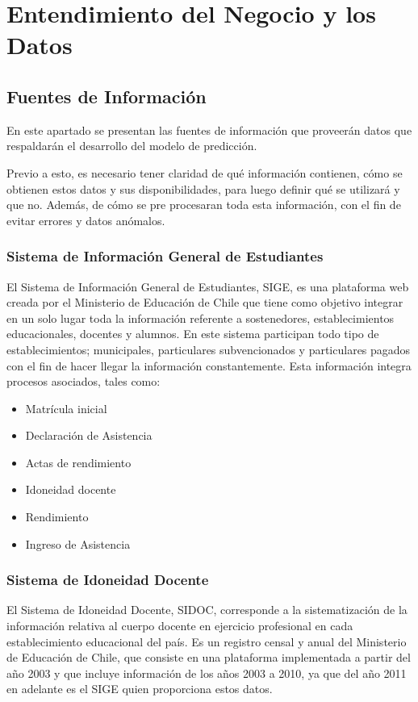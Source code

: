 \section{Entendimiento del Negocio y los Datos}
\subsection{Fuentes de Información}
En este apartado se presentan las fuentes de información que proveerán datos que respaldarán el desarrollo del modelo de predicción. 

Previo a esto, es necesario tener claridad de qué información contienen, cómo se obtienen estos datos y sus disponibilidades, para luego definir qué se utilizará y que no. Además, de cómo se pre procesaran toda esta información, con el fin de evitar errores y datos anómalos. 

\subsubsection{Sistema de Información General de Estudiantes}
El Sistema de Información General de Estudiantes, SIGE, es una plataforma web creada por el Ministerio de Educación de Chile que tiene como objetivo integrar en un solo lugar toda la información referente a sostenedores, establecimientos educacionales, docentes y alumnos. 
En este sistema participan todo tipo de establecimientos; municipales, particulares subvencionados y particulares pagados con el fin de hacer llegar la información constantemente. 
Esta información integra procesos asociados, tales como:
\begin{itemize}
\item Matrícula inicial
\item Declaración de Asistencia
\item Actas de rendimiento 
\item Idoneidad docente
\item Rendimiento 
\item Ingreso de Asistencia
\end{itemize}

\subsubsection{Sistema de Idoneidad Docente}
El Sistema de Idoneidad Docente, SIDOC, corresponde a la sistematización de la información relativa al cuerpo docente en ejercicio profesional en cada establecimiento educacional del país. Es un registro censal y anual del Ministerio de Educación de Chile, que consiste en una plataforma implementada a partir del año 2003 y que incluye información de los años 2003 a 2010, ya que del año 2011 en adelante es el SIGE quien proporciona estos datos.

